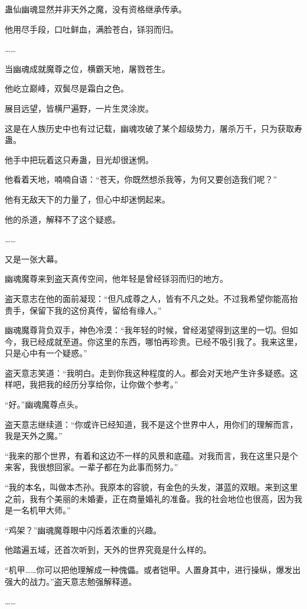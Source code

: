 \begin{this_body}
蛊仙幽魂显然并非天外之魔，没有资格继承传承。

他用尽手段，口吐鲜血，满脸苍白，铩羽而归。

……

当幽魂成就魔尊之位，横霸天地，屠戮苍生。

他屹立巅峰，双鬓尽是霜白之色。

展目远望，皆横尸遍野，一片生灵涂炭。

这是在人族历史中也有过记载，幽魂攻破了某个超级势力，屠杀万千，只为获取寿蛊。

他手中把玩着这只寿蛊，目光却很迷惘。

他看着天地，喃喃自语：“苍天，你既然想杀我等，为何又要创造我们呢？”

他有无敌天下的力量了，但心中却迷惘起来。

他的杀道，解释不了这个疑惑。

……

又是一张大幕。

幽魂魔尊来到盗天真传空间，他年轻是曾经铩羽而归的地方。

盗天意志在他的面前凝现：“但凡成尊之人，皆有不凡之处。不过我希望你能高抬贵手，保留下我的这份真传，留给有缘人。”

幽魂魔尊背负双手，神色冷漠：“我年轻的时候，曾经渴望得到这里的一切。但如今，我已经成就至道。你这里的东西，哪怕再珍贵。已经不吸引我了。我来这里，只是心中有一个疑惑。”

盗天意志笑道：“我明白。走到你我这种程度的人。都会对天地产生许多疑惑。这样吧，我把我的经历分享给你，让你做个参考。”

“好。”幽魂魔尊点头。

盗天意志继续道：“你或许已经知道，我不是这个世界中人，用你们的理解而言，我是天外之魔。”

“我来的那个世界，有着和这边不一样的风景和底蕴。对我而言，我在这里只是个来客，我很想回家。一辈子都在为此事而努力。”

“我的本名，叫做本杰孙。我原本的容貌，有金色的头发，湛蓝的双眼。来到这里之前，我有个美丽的未婚妻，正在商量婚礼的准备。我的社会地位也很高，因为我是一名机甲大师。”

“鸡架？”幽魂魔尊眼中闪烁着浓重的兴趣。

他踏遍五域，还首次听到，天外的世界究竟是什么样的。

“机甲……你可以把他理解成一种傀儡。或者铠甲。人置身其中，进行操纵，爆发出强大的战力。”盗天意志勉强解释道。

……


\end{this_body}
